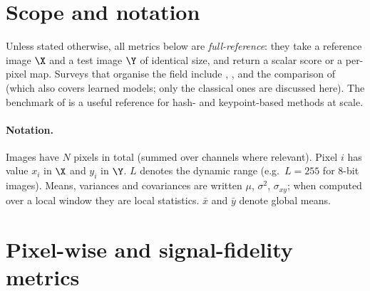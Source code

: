 \begin{abstract}
This document collects the classical, hand-designed metrics used to compare two images: pixel-wise error measures, structural and perceptually motivated indices, colour-difference formulas, histogram and information-theoretic measures, correlation and shape-based measures, and perceptual hashes. Metrics that rely on learned (machine-learning) models, such as LPIPS or DISTS, are deliberately excluded. For each metric we give the definition, typical range and interpretation, notable properties and failure modes, and a citation (including arXiv preprints where one exists). A summary table closes the document.
\end{abstract}

\tableofcontents

\section{Scope and notation}

Unless stated otherwise, all metrics below are \emph{full-reference}: they take a reference image $\X$ and a test image $\Y$ of identical size, and return a scalar score or a per-pixel map. Surveys that organise the field include \citet{pedersen2012}, \citet{lin2011survey}, and the comparison of \citet{ding2020comparison} (which also covers learned models; only the classical ones are discussed here). The benchmark of \citet{vallez2022needle} is a useful reference for hash- and keypoint-based methods at scale.

\paragraph{Notation.}
Images have $N$ pixels in total (summed over channels where relevant). Pixel $i$ has value $x_i$ in $\X$ and $y_i$ in $\Y$. $L$ denotes the dynamic range (e.g.\ $L=255$ for 8-bit images). Means, variances and covariances are written $\mu$, $\sigma^2$, $\sigma_{xy}$; when computed over a local window they are local statistics. $\bar{x}$ and $\bar{y}$ denote global means.

\section{Pixel-wise and signal-fidelity metrics}

